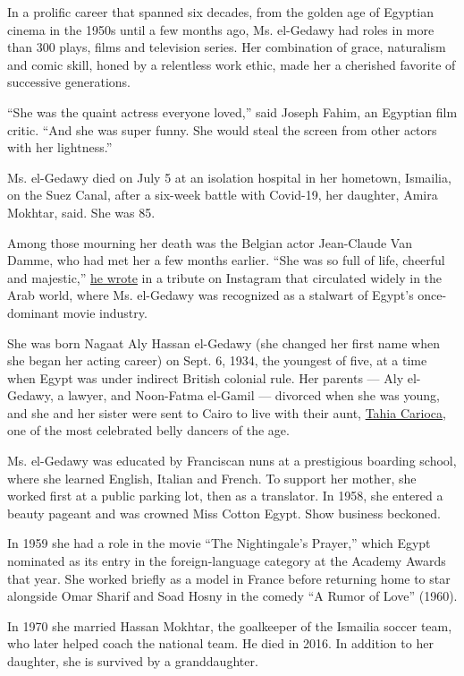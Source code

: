 In a prolific career that spanned six decades, from the golden age of
Egyptian cinema in the 1950s until a few months ago, Ms. el-Gedawy had
roles in more than 300 plays, films and television series. Her
combination of grace, naturalism and comic skill, honed by a relentless
work ethic, made her a cherished favorite of successive generations.

``She was the quaint actress everyone loved,'' said Joseph Fahim, an
Egyptian film critic. ``And she was super funny. She would steal the
screen from other actors with her lightness.''

Ms. el-Gedawy died on July 5 at an isolation hospital in her hometown,
Ismailia, on the Suez Canal, after a six-week battle with Covid-19, her
daughter, Amira Mokhtar, said. She was 85.

Among those mourning her death was the Belgian actor Jean-Claude Van
Damme, who had met her a few months earlier. ``She was so full of life,
cheerful and majestic,''
\href{https://www.instagram.com/p/CCSrVanFNwJ/?utm_source=ig_embed}{he
wrote} in a tribute on Instagram that circulated widely in the Arab
world, where Ms. el-Gedawy was recognized as a stalwart of Egypt's
once-dominant movie industry.

She was born Nagaat Aly Hassan el-Gedawy (she changed her first name
when she began her acting career) on Sept. 6, 1934, the youngest of
five, at a time when Egypt was under indirect British colonial rule. Her
parents --- Aly el-Gedawy, a lawyer, and Noon-Fatma el-Gamil ---
divorced when she was young, and she and her sister were sent to Cairo
to live with their aunt,
\href{https://www.nytimes3xbfgragh.onion/1999/09/22/arts/tahia-carioca-79-dies-a-renowned-belly-dancer.html}{Tahia
Carioca}, one of the most celebrated belly dancers of the age.

Ms. el-Gedawy was educated by Franciscan nuns at a prestigious boarding
school, where she learned English, Italian and French. To support her
mother, she worked first at a public parking lot, then as a translator.
In 1958, she entered a beauty pageant and was crowned Miss Cotton Egypt.
Show business beckoned.

In 1959 she had a role in the movie ``The Nightingale's Prayer,'' which
Egypt nominated as its entry in the foreign-language category at the
Academy Awards that year. She worked briefly as a model in France before
returning home to star alongside Omar Sharif and Soad Hosny in the
comedy ``A Rumor of Love'' (1960).

In 1970 she married Hassan Mokhtar, the goalkeeper of the Ismailia
soccer team, who later helped coach the national team. He died in 2016.
In addition to her daughter, she is survived by a granddaughter.

